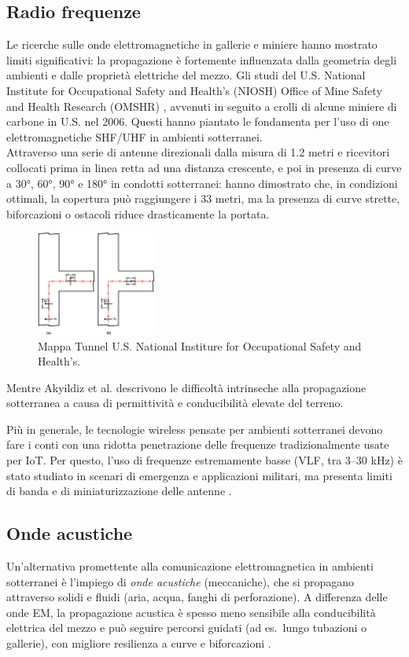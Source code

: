 \subsection{Radio frequenze}
Le ricerche sulle onde elettromagnetiche in gallerie e miniere hanno mostrato
limiti significativi: la propagazione è fortemente influenzata dalla geometria degli
ambienti e dalle proprietà elettriche del mezzo.
Gli studi del U.S. National Institute for Occupational Safety and Health’s (NIOSH) Office of Mine Safety and Health Research (OMSHR)
\cite{jacksha2016}, avvenuti in seguito a crolli di alcune miniere di carbone
in U.S. nel 2006.
Questi hanno piantato le fondamenta per l'uso di one elettromagnetiche SHF/UHF in ambienti sotterranei.\\
Attraverso una serie di antenne direzionali dalla misura di 1.2 metri e ricevitori collocati prima in linea
retta ad una distanza crescente, e poi in presenza di curve a 30°, 60°, 90° e 180° in condotti sotterranei: 
hanno dimostrato che, in condizioni ottimali, la copertura può raggiungere i 33 metri, ma la presenza di curve strette, biforcazioni o ostacoli riduce drasticamente la portata\cite{jacksha2016}.
\begin{figure}[H]
    \centering
    \includegraphics[width=0.35\textwidth]{immagini/corner_em.jpg}
    \caption{Mappa Tunnel U.S. National Institure for Occupational Safety and Health's\cite{jacksha2016}.}
    \label{fig:esempio}
\end{figure}
Mentre
Akyildiz et al. \cite{akyildiz2006} descrivono le difficoltà intrinseche alla
propagazione sotterranea a causa di permittività e conducibilità elevate del terreno.

Più in generale, le tecnologie wireless pensate per ambienti sotterranei devono
fare i conti con una ridotta penetrazione delle frequenze tradizionalmente usate
per IoT. Per questo, l'uso di frequenze estremamente basse (VLF, tra 3–30 kHz)
è stato studiato in scenari di emergenza e applicazioni militari, ma presenta
limiti di banda e di miniaturizzazione delle antenne \cite{salam2023survey}.
\subsection{Onde acustiche}
Un'alternativa promettente alla comunicazione elettromagnetica in ambienti sotterranei è l'impiego di \emph{onde acustiche} (meccaniche), che si propagano attraverso solidi e fluidi (aria, acqua, fanghi di perforazione). A differenza delle onde EM, la propagazione acustica è spesso meno sensibile alla conducibilità elettrica del mezzo e può seguire percorsi guidati (ad es.\ lungo tubazioni o gallerie), con migliore resilienza a curve e biforcazioni \cite{fishta2023inpipe,heifetz2017pipes,farai2023mdpe}.

